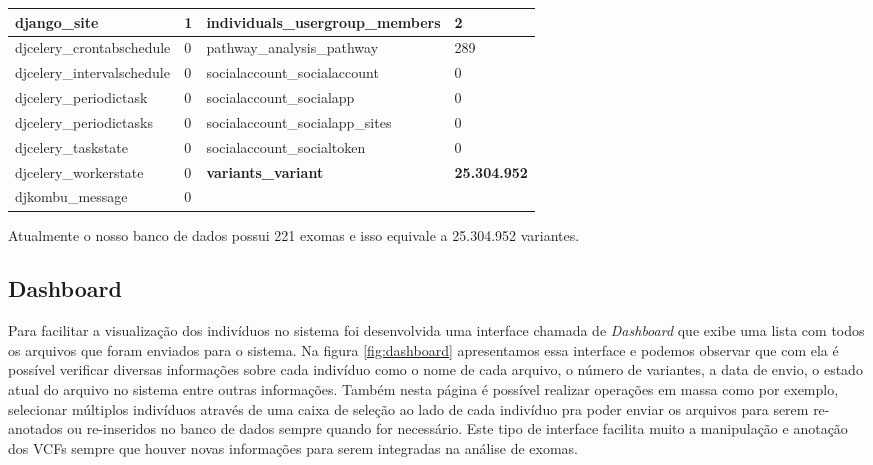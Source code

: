 {\begin{table}[p]
\begin{center}
{\begin{tabular}{|p{6cm}|p{2cm}|p{10cm}|p{3cm}|}
django\_site                  & 1                  & individuals\_usergroup\_members               & 2                  \\ \hline
djcelery\_crontabschedule     & 0                  & pathway\_analysis\_pathway                    & 289                \\ \hline
djcelery\_intervalschedule    & 0                  & socialaccount\_socialaccount                  & 0                  \\ \hline
djcelery\_periodictask        & 0                  & socialaccount\_socialapp                      & 0                  \\ \hline
djcelery\_periodictasks       & 0                  & socialaccount\_socialapp\_sites               & 0                  \\ \hline
djcelery\_taskstate           & 0                  & socialaccount\_socialtoken                    & 0                  \\ \hline
djcelery\_workerstate         & 0                  & \textbf{variants\_variant}                    & \textbf{25.304.952}  \\ \hline
djkombu\_message              & 0                  &                                               &                    \\ \hline
\end{tabular}
}
\end{center}
\label{table:registros}
\end{table}
\clearpage
}

\normalsize

Atualmente o nosso banco de dados possui 221 exomas e isso equivale a 25.304.952 variantes.

\subsection{Dashboard}

Para facilitar a visualização dos indivíduos no sistema foi desenvolvida uma interface chamada de \textit{Dashboard} que exibe uma lista com todos os arquivos que foram enviados para o sistema. Na figura \ref{fig:dashboard} apresentamos essa interface e podemos observar que com ela é possível verificar diversas informações sobre cada indivíduo como o nome de cada arquivo, o número de variantes, a data de envio, o estado atual do arquivo no sistema entre outras informações. Também nesta página é possível realizar operações em massa como por exemplo, selecionar múltiplos indivíduos através de uma caixa de seleção ao lado de cada indivíduo pra poder enviar os arquivos para serem re-anotados ou re-inseridos no banco de dados sempre quando for necessário. Este tipo de interface facilita muito a manipulação e anotação dos VCFs sempre que houver novas informações para serem integradas na análise de exomas.


